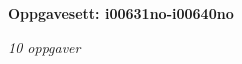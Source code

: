 \centerline{\bf Oppgavesett: i00631no-i00640no}
\vskip 10pt
\centerline{\it 10 oppgaver}\vskip 10pt
\vskip 10pt
